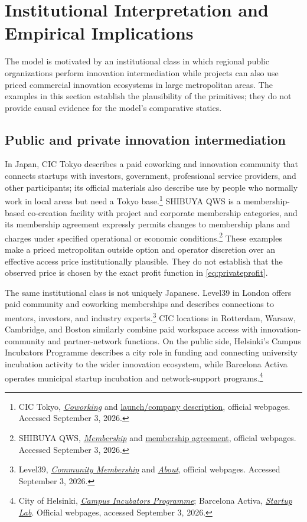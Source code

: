 \section{Institutional Interpretation and Empirical Implications}\label{sec:institution}

The model is motivated by an institutional class in which regional public organizations perform innovation intermediation while projects can also use priced commercial innovation ecosystems in large metropolitan areas. The examples in this section establish the plausibility of the primitives; they do not provide causal evidence for the model's comparative statics.

\subsection{Public and private innovation intermediation}

In Japan, CIC Tokyo describes a paid coworking and innovation community that connects startups with investors, government, professional service providers, and other participants; its official materials also describe use by people who normally work in local areas but need a Tokyo base.\footnote{CIC Tokyo, \href{https://jp.cic.com/office-space/co-working/}{\emph{Coworking}} and \href{https://jp.cic.com/en/news/launch-on-1-oct-2020/}{launch/company description}, official webpages. Accessed September 3, 2026.} SHIBUYA QWS is a membership-based co-creation facility with project and corporate membership categories, and its membership agreement expressly permits changes to membership plans and charges under specified operational or economic conditions.\footnote{SHIBUYA QWS, \href{https://shibuya-qws.com/membership}{\emph{Membership}} and \href{https://shibuya-qws.com/membership/agreement/}{membership agreement}, official webpages. Accessed September 3, 2026.} These examples make a priced metropolitan outside option and operator discretion over an effective access price institutionally plausible. They do not establish that the observed price is chosen by the exact profit function in \eqref{eq:privateprofit}.

The same institutional class is not uniquely Japanese. Level39 in London offers paid community and coworking memberships and describes connections to mentors, investors, and industry experts.\footnote{Level39, \href{https://level39.co/workspaces/community-membership/}{\emph{Community Membership}} and \href{https://level39.co/about/}{\emph{About}}, official webpages. Accessed September 3, 2026.} CIC locations in Rotterdam, Warsaw, Cambridge, and Boston similarly combine paid workspace access with innovation-community and partner-network functions. On the public side, Helsinki's Campus Incubators Programme describes a city role in funding and connecting university incubation activity to the wider innovation ecosystem, while Barcelona Activa operates municipal startup incubation and network-support programs.\footnote{City of Helsinki, \href{https://www.hel.fi/en/business-and-work/campus-incubators-programme}{\emph{Campus Incubators Programme}}; Barcelona Activa, \href{https://emprenedoria.barcelonactiva.cat/en/startup-lab}{\emph{Startup Lab}}. Official webpages, accessed September 3, 2026.}

